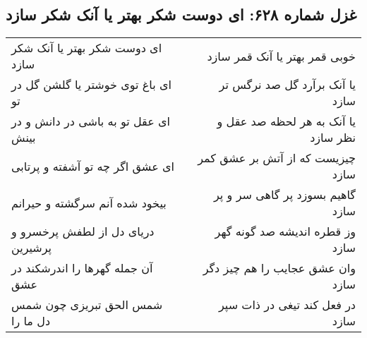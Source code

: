 \begin{center}
\section*{غزل شماره ۶۲۸: ای دوست شکر بهتر یا آنک شکر سازد}
\label{sec:0628}
\begin{longtable}{l p{0.5cm} r}
ای دوست شکر بهتر یا آنک شکر سازد
&&
خوبی قمر بهتر یا آنک قمر سازد
\\
ای باغ توی خوشتر یا گلشن گل در تو
&&
یا آنک برآرد گل صد نرگس تر سازد
\\
ای عقل تو به باشی در دانش و در بینش
&&
یا آنک به هر لحظه صد عقل و نظر سازد
\\
ای عشق اگر چه تو آشفته و پرتابی
&&
چیزیست که از آتش بر عشق کمر سازد
\\
بیخود شده آنم سرگشته و حیرانم
&&
گاهیم بسوزد پر گاهی سر و پر سازد
\\
دریای دل از لطفش پرخسرو و پرشیرین
&&
وز قطره اندیشه صد گونه گهر سازد
\\
آن جمله گهرها را اندرشکند در عشق
&&
وان عشق عجایب را هم چیز دگر سازد
\\
شمس الحق تبریزی چون شمس دل ما را
&&
در فعل کند تیغی در ذات سپر سازد
\\
\end{longtable}
\end{center}
